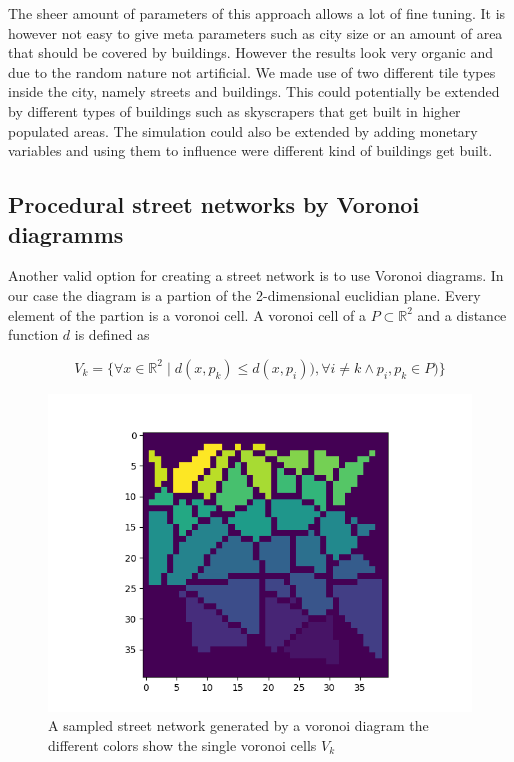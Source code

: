 \documentclass{scrartcl}
\begin{document}
The sheer amount of parameters of this approach allows a lot of fine tuning.
It is however not easy to give meta parameters such as city size or an amount
of area that should be covered by buildings. However the results look very organic
and due to the random nature not artificial. We made use of two different tile types
inside the city, namely streets and buildings. This could potentially be extended
by different types of buildings such as skyscrapers that get built in higher
populated areas. The simulation could also be extended by adding monetary variables
and using them to influence were different kind of buildings get built.

\subsection{Procedural street networks by Voronoi diagramms}

Another valid option for creating a street network is to use Voronoi diagrams.
In our case the diagram is a partion of the 2-dimensional euclidian plane.
Every element of the partion is a voronoi cell.
A voronoi cell of a  $ P \subset \mathbb{R}^2 $ and a distance function $d$ is defined as

\[
    V_k=\lbrace \forall x \in \mathbb{R}^2 \mid d(x,p_k) \leq d(x,p_i)), \forall i \ne k \land p_i,p_k \in P ) \rbrace
\]

\begin{figure}
    \centering
    \includegraphics[scale = 0.5]{voro}
    \caption{A sampled street network generated by a voronoi diagram
    the different colors show the single voronoi cells $V_k$}
    \label{fig:voronoi}
\end{figure}
\end{document}
